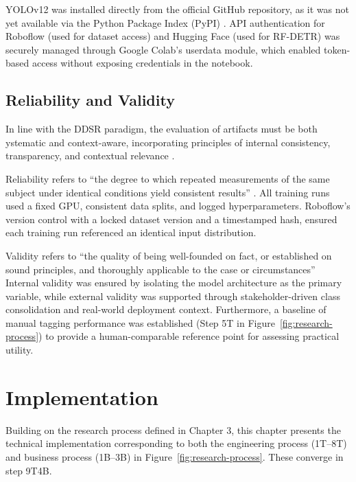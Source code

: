 \documentclass[a4paper,10pt,twocolumn]{article}
\numberwithin{figure}{section}
\numberwithin{table}{section}
\begin{document}
YOLOv12 was installed directly from the official GitHub repository, 
as it was not yet available via the Python Package Index (PyPI) \citep{yolov12repo}.
API authentication for Roboflow (used for dataset access) and Hugging 
Face (used for RF-DETR) was securely managed through Google 
Colab’s userdata module, which enabled token-based access 
without exposing credentials in the notebook.

\subsection{Reliability and Validity}
In line with the 
DDSR paradigm, the evaluation of artifacts must be both 
ystematic and context-aware, incorporating principles of 
internal consistency, transparency, and contextual 
relevance \citep{hevner2004design, vomBrocke2020introduction}.

Reliability refers to “the degree to which repeated 
measurements of the same subject under identical conditions 
yield consistent results” \citep{oedReliability}.
All training runs used a fixed GPU, 
consistent data splits, and logged hyperparameters. 
Roboflow’s version control with a locked dataset version 
and a timestamped hash, ensured each training run referenced 
an identical input distribution. 

Validity refers to “the quality of being well-founded on fact, 
or established on sound principles, and thoroughly applicable 
to the case or circumstances”
Internal validity was ensured by isolating the model 
architecture as the primary variable, while external 
validity was supported through stakeholder-driven 
class consolidation and real-world deployment context.
Furthermore, a baseline of manual tagging performance was 
established (Step 5T in Figure~\ref{fig:research-process}) 
to provide a human-comparable reference point for assessing 
practical utility.

\section{ Implementation}

Building on the research process defined in Chapter 3, 
this chapter presents the technical implementation 
corresponding to both the engineering process (1T–8T) 
and business process (1B–3B) in Figure~\ref{fig:research-process}. 
These converge in step 9T4B.
\end{document}
